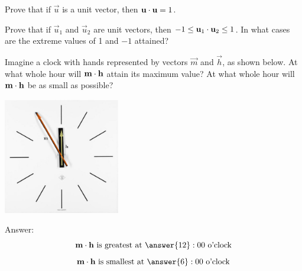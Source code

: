 \documentclass{ximera}
\begin{document}
\begin{problem}\label{prob:unitvectordot}
Prove that if $\vec{u}$ is a unit vector, then $\mathbf{u}\cdot \mathbf{u}=1$.
\end{problem}

\begin{problem}\label{prob:unitvectordot1}
 Prove that if $\vec{u}_1$ and $\vec{u}_2$ are unit vectors, then $-1\leq\mathbf{u}_1\cdot \mathbf{u}_2\leq 1$.  In what cases are the extreme values of 1 and $-1$ attained?
\end{problem} 

\begin{problem}\label{prob:clockproblem}
 Imagine a clock with hands represented by vectors $\vec{m}$ and $\vec{h}$, as shown below.
At what whole hour will $\mathbf{m}\cdot\mathbf{h}$ attain its maximum value?  At what whole hour will $\mathbf{m}\cdot\mathbf{h}$ be as small as possible?

\begin{center}
\includegraphics[height=2in]{clockvectors.jpg}
\end{center}

Answer:$$\vec{m}\dotp\vec{h}\text{ is greatest at }\answer{12}:00 \text{ o'clock}$$
$$\vec{m}\dotp\vec{h}\text{ is smallest at }\answer{6}:00 \text{ o'clock}$$
\end{problem}
\end{document}
